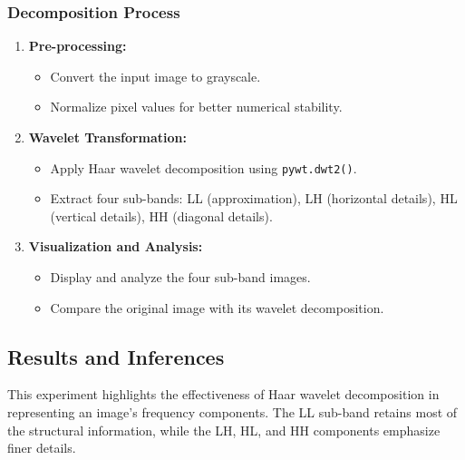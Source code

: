 \documentclass[12pt,a4paper]{article}
\begin{document}
\subsubsection{Decomposition Process}
\begin{enumerate}
  \item \textbf{Pre-processing:}
    \begin{itemize}
      \item Convert the input image to grayscale.
      \item Normalize pixel values for better numerical stability.
    \end{itemize}

  \item \textbf{Wavelet Transformation:}
    \begin{itemize}
      \item Apply Haar wavelet decomposition using \texttt{pywt.dwt2()}.
      \item Extract four sub-bands: LL (approximation), LH (horizontal details), HL (vertical details), HH (diagonal details).
    \end{itemize}

  \item \textbf{Visualization and Analysis:}
    \begin{itemize}
      \item Display and analyze the four sub-band images.
      \item Compare the original image with its wavelet decomposition.
    \end{itemize}
\end{enumerate}

\subsection{Results and Inferences}
This experiment highlights the effectiveness of Haar wavelet decomposition in representing an image's frequency components. The LL sub-band retains most of the structural information, while the LH, HL, and HH components emphasize finer details.
\end{document}
